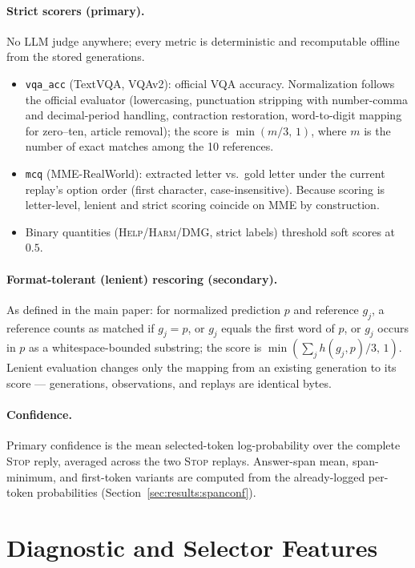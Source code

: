 \documentclass[10pt]{article}
\begin{document}
\paragraph{Strict scorers (primary).}
No LLM judge anywhere; every metric is deterministic and recomputable
offline from the stored generations.
\begin{itemize}
\item \texttt{vqa\_acc} (TextVQA, VQAv2): official VQA accuracy.
  Normalization follows the official evaluator (lowercasing, punctuation
  stripping with number-comma and decimal-period handling, contraction
  restoration, word-to-digit mapping for zero--ten, article removal); the
  score is $\min(m/3,\,1)$, where $m$ is the number of exact matches among
  the 10 references.
\item \texttt{mcq} (MME-RealWorld): extracted letter vs.\ gold letter under
  the current replay's option order (first character, case-insensitive).
  Because scoring is letter-level, lenient and strict scoring coincide on
  MME by construction.
\item Binary quantities (\textsc{Help}/\textsc{Harm}/DMG, strict labels)
  threshold soft scores at $0.5$.
\end{itemize}

\paragraph{Format-tolerant (lenient) rescoring (secondary).}
As defined in the main paper: for normalized prediction $p$ and reference
$g_j$, a reference counts as matched if $g_j = p$, or $g_j$ equals the
first word of $p$, or $g_j$ occurs in $p$ as a whitespace-bounded
substring; the score is $\min(\sum_j h(g_j,p)/3,\,1)$. Lenient evaluation
changes only the mapping from an existing generation to its score ---
generations, observations, and replays are identical bytes.

\paragraph{Confidence.}
Primary confidence is the mean selected-token log-probability over the
complete \textsc{Stop} reply, averaged across the two \textsc{Stop}
replays. Answer-span mean, span-minimum, and first-token variants are
computed from the already-logged per-token probabilities
(Section~\ref{sec:results:spanconf}).

\section{Diagnostic and Selector Features}
\label{sec:features}
\end{document}

